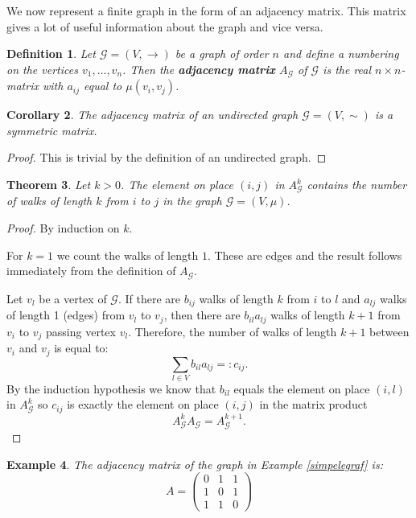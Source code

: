 \documentclass[a4paper,11pt]{report}
\newtheorem{theorem}{Theorem}[section]
\newtheorem{example}[theorem]{Example}
\newtheorem{definition}[theorem]{Definition}
\newtheorem{corollary}[theorem]{Corollary}
\newcommand{\graf}{\mathscr{G}}
\begin{document}
 We now represent a finite graph in the form of an adjacency matrix. This 
 matrix gives a lot of useful information about the graph and vice versa.
 
 
 \begin{definition}
 Let $\graf=(V, \to)$ be a graph of order $n$ and define a numbering on the 
 vertices $v_1,\ldots, v_n$. Then the \textbf{adjacency matrix} $A_\graf$ of $\graf$ is the real
 $n\times n$-matrix with $a_{ij}$ equal to $\mu(v_i, v_j)$.
 \end{definition}
 
 \begin{corollary}
   The adjacency matrix of an undirected graph $\graf=(V, \sim)$ is a symmetric 
   matrix.
 \end{corollary}
 
 \begin{proof}
   This is trivial by the definition of an undirected graph.
 \end{proof}
\begin{theorem}\label{numberwalks}
  Let $k > 0$. The element on place $(i,j)$ in $A^k_\graf$ contains the number 
  of walks of length $k$ from $i$ to $j$ in the graph $\graf = (V, \mu)$.
\end{theorem}
 \begin{proof}
   By induction on $k$. 
   
   For $k = 1$ we count the walks of length $1$. These are edges and the 
   result follows immediately from the definition of $A_\graf$.
   
  Let $v_l$ be a vertex of $\graf$. If there are $b_{ij}$ walks of length $k$ 
  from $i$ to $l$ and $a_{lj}$ walks of length 1 (edges) from $v_l$ to $v_j$, 
  then there are $b_{il}a_{lj}$ walks of length $k+1$ from $v_i$ to $v_j$ passing vertex 
  $v_l$. Therefore, the number of walks of length $k+1$ between $v_i$ and $v_j$ 
  is equal to:
  $$\sum_{l\in V} b_{il}a_{lj} =: c_{ij}.$$
By the induction hypothesis we know that $b_{il}$ equals  the element on place $(i,l)$ 
in $A^k_\graf$ so $c_{ij}$ is exactly the element on place $(i,j)$ in the matrix 
product
$$A^k_\graf A_\graf = A^{k+1}_\graf.$$
 \end{proof}
 \begin{example}
The adjacency matrix of the graph in Example \ref{simpelegraf} is:
$$A = \begin{pmatrix}
0 & 1 & 1\\
1 & 0 & 1\\
1 & 1 & 0
\end{pmatrix}$$


\end{example}
\end{document}
